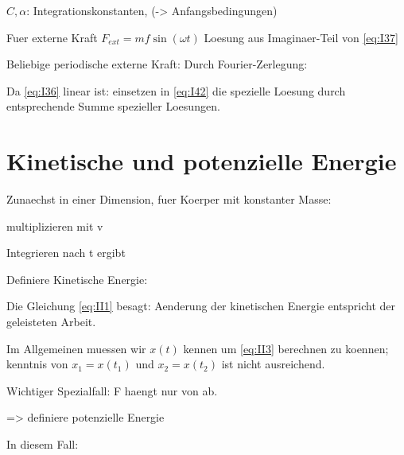 \documentclass{article}
\begin{document}

$C, \alpha$: Integrationskonstanten, (-> Anfangsbedingungen)

Fuer externe Kraft $F_{ext} = m f \sin(\omega t)$ Loesung aus Imaginaer-Teil von \ref{eq:I37}

Beliebige periodische externe Kraft: Durch Fourier-Zerlegung:

Da \ref{eq:I36} linear ist: einsetzen in \ref{eq:I42} die spezielle Loesung durch entsprechende Summe spezieller Loesungen.

\section{Kinetische und potenzielle Energie}

Zunaechst in einer Dimension, fuer Koerper mit konstanter Masse:


multiplizieren mit v


Integrieren nach t ergibt


Definiere Kinetische Energie:

Die Gleichung \ref{eq:II1} besagt: Aenderung der kinetischen Energie entspricht der geleisteten Arbeit.


Im Allgemeinen muessen wir $x(t)$ kennen um \ref{eq:II3} berechnen zu koennen; kenntnis von $x_1 = x(t_1)$ und $x_2 = x(t_2)$ ist nicht ausreichend. 

Wichtiger Spezialfall: F haengt nur von  ab.

=> definiere potenzielle Energie 

In diesem Fall:

\end{document}
